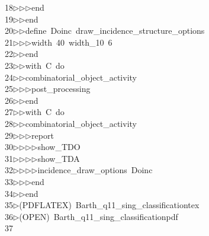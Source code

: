 \begin{tabbing}
18\>$\triangleright$\>$\triangleright$\>$\triangleright$\>end\ \\[0pt]
19\>$\triangleright$\>$\triangleright$\>end\ \\[0pt]
20\>$\triangleright$\>$\triangleright$\>define\ Doinc\ draw\_incidence\_structure\_options\ \\[0pt]
21\>$\triangleright$\>$\triangleright$\>$\triangleright$\>width\ 40\ width\_10\ 6\ \\[0pt]
22\>$\triangleright$\>$\triangleright$\>end\ \\[0pt]
23\>$\triangleright$\>$\triangleright$\>with\ C\ do\ \\[0pt]
24\>$\triangleright$\>$\triangleright$\>combinatorial\_object\_activity\ \\[0pt]
25\>$\triangleright$\>$\triangleright$\>$\triangleright$\>post\_processing\ \\[0pt]
26\>$\triangleright$\>$\triangleright$\>end\ \\[0pt]
27\>$\triangleright$\>$\triangleright$\>with\ C\ do\ \\[0pt]
28\>$\triangleright$\>$\triangleright$\>combinatorial\_object\_activity\ \\[0pt]
29\>$\triangleright$\>$\triangleright$\>$\triangleright$\>report\ \\[0pt]
30\>$\triangleright$\>$\triangleright$\>$\triangleright$\>$\triangleright$\>show\_TDO\ \\[0pt]
31\>$\triangleright$\>$\triangleright$\>$\triangleright$\>$\triangleright$\>show\_TDA\ \\[0pt]
32\>$\triangleright$\>$\triangleright$\>$\triangleright$\>$\triangleright$\>incidence\_draw\_options\ Doinc\ \\[0pt]
33\>$\triangleright$\>$\triangleright$\>$\triangleright$\>end\ \\[0pt]
34\>$\triangleright$\>$\triangleright$\>end\\[0pt]
35\>$\triangleright$\>(PDFLATEX)\ Barth\_q11\_sing\_classificationtex\\[0pt]
36\>$\triangleright$\>(OPEN)\ Barth\_q11\_sing\_classificationpdf\\[0pt]
37\>\end{tabbing}
